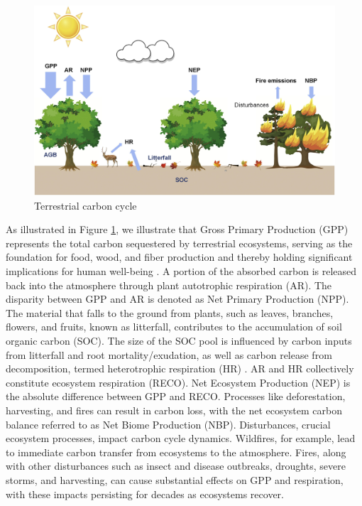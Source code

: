 \begin{figure}
    \centering
    \includegraphics[width=\textwidth]{figs/chap2/fig1.jpg}
    \caption{Terrestrial carbon cycle \citep{xiao2019remote}}
    \label{chap2:fig_fig1}
\end{figure}

As illustrated in Figure \ref{chap2:fig_fig1}, we illustrate that Gross Primary Production (GPP) represents the total carbon sequestered by terrestrial ecosystems, serving as the foundation for food, wood, and fiber production and thereby holding significant implications for human well-being \citep{xiao2019remote}. A portion of the absorbed carbon is released back into the atmosphere through plant autotrophic respiration (AR). The disparity between GPP and AR is denoted as Net Primary Production (NPP). The material that falls to the ground from plants, such as leaves, branches, flowers, and fruits, known as litterfall, contributes to the accumulation of soil organic carbon (SOC). The size of the SOC pool is influenced by carbon inputs from litterfall and root mortality/exudation, as well as carbon release from decomposition, termed heterotrophic respiration (HR) \citep{liu2011simulating}. AR and HR collectively constitute ecosystem respiration (RECO). Net Ecosystem Production (NEP) is the absolute difference between GPP and RECO. Processes like deforestation, harvesting, and fires can result in carbon loss, with the net ecosystem carbon balance referred to as Net Biome Production (NBP). Disturbances, crucial ecosystem processes, impact carbon cycle dynamics. Wildfires, for example, lead to immediate carbon transfer from ecosystems to the atmosphere. Fires, along with other disturbances such as insect and disease outbreaks, droughts, severe storms, and harvesting, can cause substantial effects on GPP and respiration, with these impacts persisting for decades as ecosystems recover. \par

